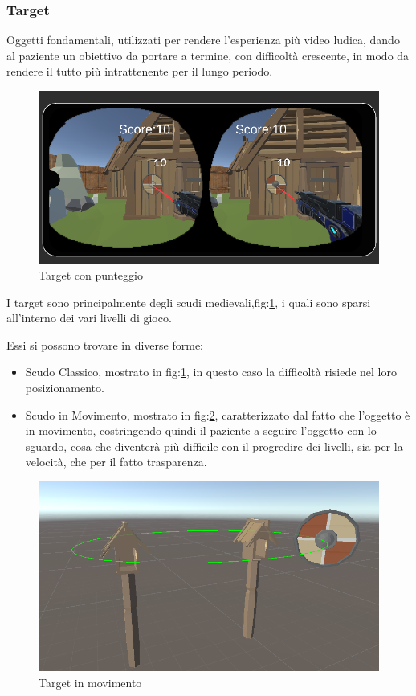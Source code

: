 \documentclass[10pt,a4paper]{article}
\begin{document}
    \subsubsection{Target}
    Oggetti fondamentali, utilizzati per rendere l'esperienza più video ludica, dando al paziente un obiettivo da portare a termine, con difficoltà crescente, in modo da rendere il tutto più intrattenente per il lungo periodo.
    \begin{figure}[H]
	  	\centering
	  	\includegraphics[width=0.7\linewidth]{image/target_score}
	  	\caption{Target con punteggio}
	  	\label{fig:target_score}
    \end{figure}
    
    I target sono principalmente degli scudi medievali,fig:\ref{fig:target_score}, i quali sono sparsi all'interno dei vari livelli di gioco.
    
    Essi si possono trovare in diverse forme:
    \begin{itemize}
       \item Scudo Classico, mostrato in fig:\ref{fig:target_score}, in questo caso la difficoltà risiede nel loro posizionamento.
       \item Scudo in Movimento, mostrato in fig:\ref{fig:target_movimento}, caratterizzato dal fatto che l'oggetto è in movimento, costringendo quindi il paziente a seguire l'oggetto con  lo sguardo, cosa che diventerà più difficile con il progredire dei livelli, sia per la velocità, che per il fatto trasparenza.
      \end{itemize}
  \begin{figure}[H]
  	\centering
  	\includegraphics[width=0.7\linewidth]{image/target_movimento}
  	\caption{Target in movimento}
  	\label{fig:target_movimento}
  \end{figure}
\end{document}
